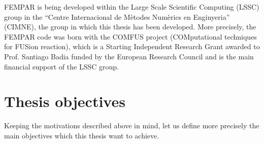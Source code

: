 FEMPAR is being developed within the Large Scale Scientific Computing (LSSC) group in the ``Centre Internacional de Mètodes Numèrics en Enginyeria'' (CIMNE), the group in which this thesis has been developed. More precisely, the FEMPAR code was born with the COMFUS project (COMputational techniques for FUSion reaction), which is a Starting Independent Research Grant awarded to Prof. Santiago Badia funded by the European Research Council and is the main financial support of the LSSC group.
 

\section{Thesis objectives}

Keeping the motivations described above in mind, let us define more precisely the main objectives which this thesis want to achieve.

